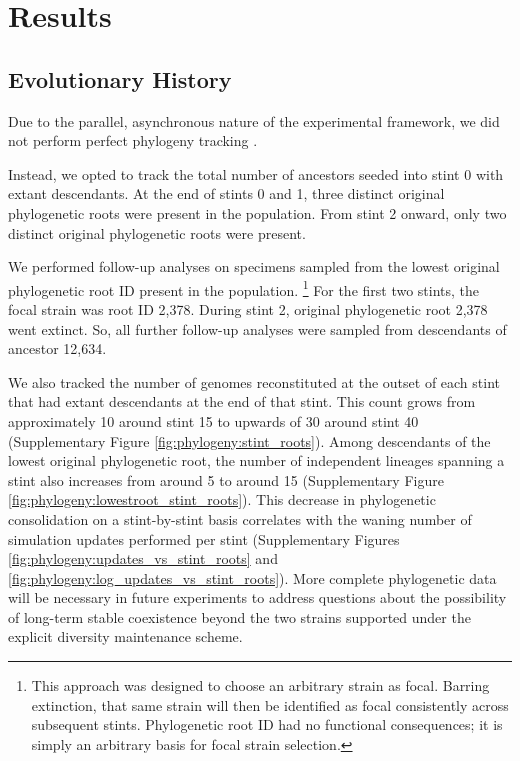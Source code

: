 



\section{Results}

\subsection{Evolutionary History}

Due to the parallel, asynchronous nature of the experimental framework, we did not perform perfect phylogeny tracking \citep{moreno2024analysis}.

Instead, we opted to track the total number of ancestors seeded into stint 0 with extant descendants.
At the end of stints 0 and 1, three distinct original phylogenetic roots were present in the population.
From stint 2 onward, only two distinct original phylogenetic roots were present.

We performed follow-up analyses on specimens sampled from the lowest original phylogenetic root ID present in the population.%
\footnote{
This approach was designed to choose an arbitrary strain as focal.
Barring extinction, that same strain will then be identified as focal consistently across subsequent stints.
Phylogenetic root ID had no functional consequences; it is simply an arbitrary basis for focal strain selection.
}
For the first two stints, the focal strain was root ID 2,378.
During stint 2, original phylogenetic root 2,378 went extinct.
So, all further follow-up analyses were sampled from descendants of ancestor 12,634.

We also tracked the number of genomes reconstituted at the outset of each stint that had extant descendants at the end of that stint.
This count grows from approximately 10 around stint 15 to upwards of 30 around stint 40 (Supplementary Figure \ref{fig:phylogeny:stint_roots}).
Among descendants of the lowest original phylogenetic root, the number of independent lineages spanning a stint also increases from around 5 to around 15
(Supplementary Figure \ref{fig:phylogeny:lowestroot_stint_roots}).
This decrease in phylogenetic consolidation on a stint-by-stint basis correlates with the waning number of simulation updates performed per stint (Supplementary Figures \ref{fig:phylogeny:updates_vs_stint_roots} and \ref{fig:phylogeny:log_updates_vs_stint_roots}).
More complete phylogenetic data will be necessary in future experiments to address questions about the possibility of long-term stable coexistence beyond the two strains supported under the explicit diversity maintenance scheme.

